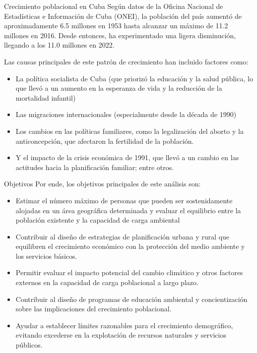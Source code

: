 \documentclass{beamer}
\begin{document}
\begin{frame}{Crecimiento poblacional en Cuba}
    \small{Según datos de la Oficina Nacional de Estadísticas e Información de Cuba (ONEI), la población del país aumentó de aproximadamente 6.5 millones en 1953 hasta alcanzar un máximo de 11.2 millones en 2016. Desde entonces, ha experimentado una ligera disminución, llegando a los 11.0 millones en 2022.}
    \begin{block}{\small{Las causas principales de este patrón de crecimiento han incluido factores como: }}
    \begin{itemize}
        \item \small{La política socialista de Cuba (que priorizó la educación y la salud pública, lo que llevó a un aumento en la esperanza de vida y la reducción de la mortalidad infantil)}
        \item \small{Las migraciones internacionales (especialmente desde la década de 1990)}
        \item \small{Los cambios en las políticas familiares, como la legalización del aborto y la anticoncepción, que afectaron la fertilidad de la población.}
        \item \small{Y el impacto de la crisis económica de 1991, que llevó a un cambio en las actitudes hacia la planificación familiar; entre otros. }
    \end{itemize}
    \end{block}
\end{frame}
\begin{frame}{Objetivos}
    Por ende, los objetivos principales de este análisis son:\\
\begin{itemize}
    \item Estimar el número máximo de personas que pueden ser sostenidamente alojadas en un área geográfica determinada y evaluar el equilibrio entre la población existente y la capacidad de carga ambiental
    \item Contribuir al diseño de estrategias de planificación urbana y rural que equilibren el crecimiento económico con la protección del medio ambiente y los servicios básicos.
    \item Permitir evaluar el impacto potencial del cambio climático y otros factores externos en la capacidad de carga poblacional a largo plazo.
    \item Contribuir al diseño de programas de educación ambiental y concientización sobre las implicaciones del crecimiento poblacional.
    \item Ayudar a establecer límites razonables para el crecimiento demográfico, evitando excederse en la explotación de recursos naturales y servicios públicos.
\end{itemize}

\end{frame} 
\end{document}
